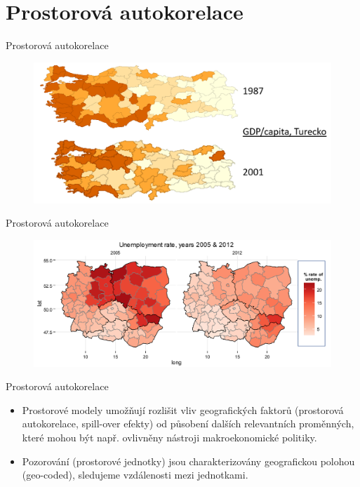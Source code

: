 \documentclass{beamer}
\begin{document}
\section{Prostorová autokorelace}
\begin{frame}{Prostorová autokorelace}
\begin{figure}
	\includegraphics[width=.9\textwidth]{IMG/sp_auto1.PNG}
\end{figure}
\end{frame}
\begin{frame}{Prostorová autokorelace}
\begin{figure}
	\includegraphics[width=.9\textwidth]{IMG/sp_auto2.PNG}
\end{figure}
\end{frame}
\begin{frame}{Prostorová autokorelace}
\begin{itemize}
\item Prostorové modely umožňují rozlišit vliv geografických faktorů (prostorová autokorelace, spill-over efekty) od působení dalších relevantních proměnných, které mohou být např. ovlivněny nástroji makroekonomické politiky.
\item Pozorování (prostorové jednotky) jsou charakterizovány geografickou polohou (geo-coded), sledujeme vzdálenosti mezi jednotkami.
\end{itemize}
\end{frame}
\end{document}
